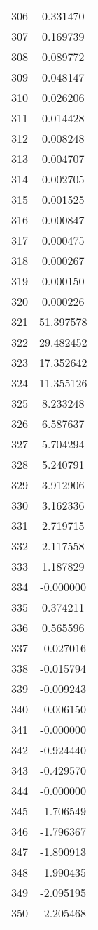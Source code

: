 \documentclass[12pt]{article}
\begin{document}
\begin{longtable}{@{}cc@{}}
306 & 0.331470 \\
307 & 0.169739 \\
308 & 0.089772 \\
309 & 0.048147 \\
310 & 0.026206 \\
311 & 0.014428 \\
312 & 0.008248 \\
313 & 0.004707 \\
314 & 0.002705 \\
315 & 0.001525 \\
316 & 0.000847 \\
317 & 0.000475 \\
318 & 0.000267 \\
319 & 0.000150 \\
320 & 0.000226 \\
321 & 51.397578 \\
322 & 29.482452 \\
323 & 17.352642 \\
324 & 11.355126 \\
325 & 8.233248 \\
326 & 6.587637 \\
327 & 5.704294 \\
328 & 5.240791 \\
329 & 3.912906 \\
330 & 3.162336 \\
331 & 2.719715 \\
332 & 2.117558 \\
333 & 1.187829 \\
334 & -0.000000 \\
335 & 0.374211 \\
336 & 0.565596 \\
337 & -0.027016 \\
338 & -0.015794 \\
339 & -0.009243 \\
340 & -0.006150 \\
341 & -0.000000 \\
342 & -0.924440 \\
343 & -0.429570 \\
344 & -0.000000 \\
345 & -1.706549 \\
346 & -1.796367 \\
347 & -1.890913 \\
348 & -1.990435 \\
349 & -2.095195 \\
350 & -2.205468 \\

\end{longtable}
\end{document}
